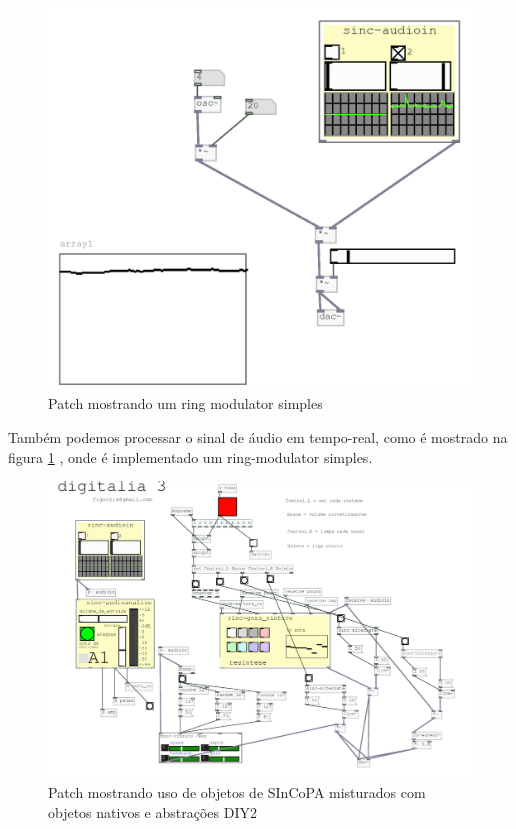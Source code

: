 \documentclass{ppgmus}
\begin{document}
\begin{figure}
\includegraphics[scale=.7]{sinc-ring}
\caption{Patch mostrando um ring modulator simples}
\label{sinc-ring}
\end{figure}


Também podemos processar o sinal de áudio em tempo-real, como é mostrado na 
figura \ref{sinc-ring} , onde é implementado um ring-modulator simples.


\begin{figure}
\includegraphics[scale=.55]{digitalia3}
\caption{Patch mostrando uso de objetos de SInCoPA misturados com objetos nativos e abstrações DIY2}
\label{digitalia3}
\end{figure}
\end{document}

